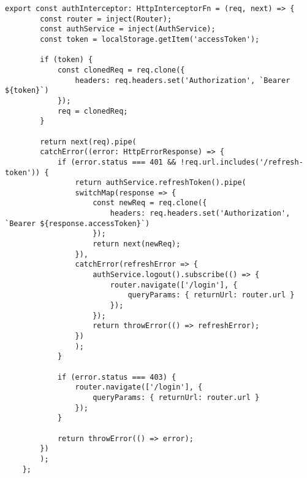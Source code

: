 \begin{lstlisting}[style=tsstyle, caption={Interceptor HTTP},label={lst:interceptorhttp}]
	export const authInterceptor: HttpInterceptorFn = (req, next) => {
		const router = inject(Router);
		const authService = inject(AuthService);
		const token = localStorage.getItem('accessToken');
		
		if (token) {
			const clonedReq = req.clone({
				headers: req.headers.set('Authorization', `Bearer ${token}`)
			});
			req = clonedReq;
		}
		
		return next(req).pipe(
		catchError((error: HttpErrorResponse) => {
			if (error.status === 401 && !req.url.includes('/refresh-token')) {
				return authService.refreshToken().pipe(
				switchMap(response => {
					const newReq = req.clone({
						headers: req.headers.set('Authorization', `Bearer ${response.accessToken}`)
					});
					return next(newReq);
				}),
				catchError(refreshError => {
					authService.logout().subscribe(() => {
						router.navigate(['/login'], {
							queryParams: { returnUrl: router.url }
						});
					});
					return throwError(() => refreshError);
				})
				);
			}
			
			if (error.status === 403) {
				router.navigate(['/login'], { 
					queryParams: { returnUrl: router.url }
				});
			}
			
			return throwError(() => error);
		})
		);
	};
\end{lstlisting}
